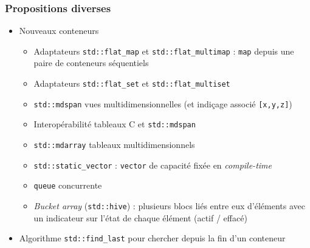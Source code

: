 \documentclass[C++.tex]{subfiles}
\begin{document}
\begin{frame}[fragile]
	\frametitle{Propositions diverses}
	\begin{itemize}
		\item Nouveaux conteneurs
		\begin{itemize}
			\item Adaptateurs \lstinline|std::flat_map| et \lstinline|std::flat_multimap| : \lstinline|map| depuis une paire de conteneurs séquentiels
			\item Adaptateurs \lstinline|std::flat_set| et \lstinline|std::flat_multiset|
			\item \lstinline|std::mdspan| vues multidimensionnelles (et indiçage associé \lstinline|[x,y,z]|)


			\item Interopérabilité tableaux C et \lstinline|std::mdspan|
			\item \lstinline|std::mdarray| tableaux multidimensionnels
			
			
			\item \lstinline|std::static_vector| : \lstinline|vector| de capacité fixée en \textit{compile-time}


			\item \lstinline|queue| concurrente
			\item \textit{Bucket array} (\lstinline|std::hive|) : plusieurs blocs liés entre eux d'éléments  avec un indicateur sur l'état de chaque élément (actif / effacé)
		\end{itemize}
		\item Algorithme \lstinline|std::find_last| pour chercher depuis la fin d'un conteneur
	\end{itemize}
\end{frame}
\end{document}
